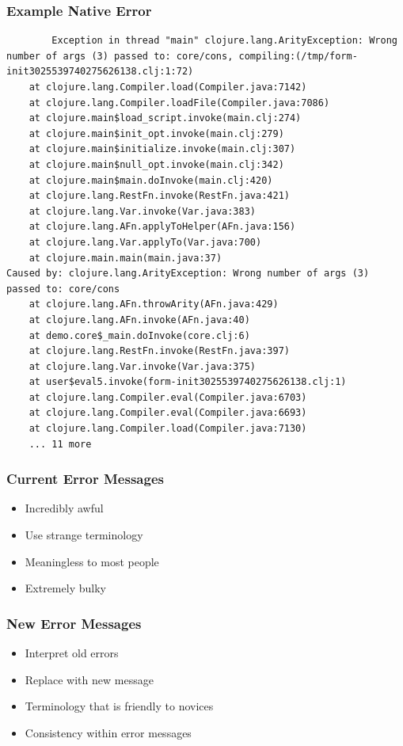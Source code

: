\documentclass{beamer}
\begin{document}
\begin{frame}[fragile]
\frametitle{Example Native Error}
		\begin{verbatim}
		Exception in thread "main" clojure.lang.ArityException: Wrong number of args (3) passed to: core/cons, compiling:(/tmp/form-init3025539740275626138.clj:1:72)
	at clojure.lang.Compiler.load(Compiler.java:7142)
	at clojure.lang.Compiler.loadFile(Compiler.java:7086)
	at clojure.main$load_script.invoke(main.clj:274)
	at clojure.main$init_opt.invoke(main.clj:279)
	at clojure.main$initialize.invoke(main.clj:307)
	at clojure.main$null_opt.invoke(main.clj:342)
	at clojure.main$main.doInvoke(main.clj:420)
	at clojure.lang.RestFn.invoke(RestFn.java:421)
	at clojure.lang.Var.invoke(Var.java:383)
	at clojure.lang.AFn.applyToHelper(AFn.java:156)
	at clojure.lang.Var.applyTo(Var.java:700)
	at clojure.main.main(main.java:37)
Caused by: clojure.lang.ArityException: Wrong number of args (3) passed to: core/cons
	at clojure.lang.AFn.throwArity(AFn.java:429)
	at clojure.lang.AFn.invoke(AFn.java:40)
	at demo.core$_main.doInvoke(core.clj:6)
	at clojure.lang.RestFn.invoke(RestFn.java:397)
	at clojure.lang.Var.invoke(Var.java:375)
	at user$eval5.invoke(form-init3025539740275626138.clj:1)
	at clojure.lang.Compiler.eval(Compiler.java:6703)
	at clojure.lang.Compiler.eval(Compiler.java:6693)
	at clojure.lang.Compiler.load(Compiler.java:7130)
	... 11 more
		\end{verbatim}	
\end{frame}

\begin{frame}
	\frametitle{Current Error Messages}
	\begin{itemize}
		\item Incredibly awful
		\item Use strange terminology
		\item Meaningless to most people
		\item Extremely bulky
	\end{itemize}
\end{frame}

\begin{frame}
	\frametitle{New Error Messages}
	\begin{itemize}
		\item Interpret old errors
		\item Replace with new message
		\item Terminology that is friendly to novices
		\item Consistency within error messages
	\end{itemize}
\end{frame}
\end{document}
